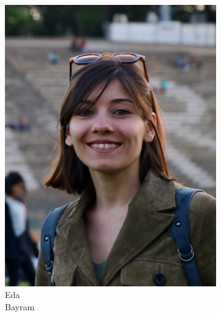 \documentclass[aspectratio=169]{beamer}
\begin{document}
\begin{frame}
\begin{figure}
\begin{subfigure}[b]{0.14\linewidth}
			\includegraphics[width=\linewidth]{picture_eda}
			\caption*{Eda\\Bayram}
		\end{subfigure}
		\hfill
		\begin{subfigure}[b]{0.14\linewidth}

\end{subfigure}
\end{figure}
\end{frame}
\end{document}
